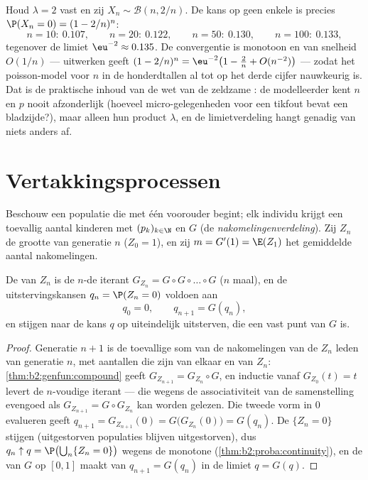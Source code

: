 \begin{example}\label{ex:b2:genfun:poissonnumerics}
Houd $\lambda = 2$ vast en zij $X_n \sim \mathcal B(n, 2/n)$. De
kans op geen enkele  is precies $\P(X_n = 0) = (1 -
2/n)^n$:
\[
n = 10:\ 0.107, \qquad
n = 20:\ 0.122, \qquad
n = 50:\ 0.130, \qquad
n = 100:\ 0.133,
\]
tegenover de limiet $\eu^{-2} \approx 0.135$. De convergentie is
monotoon en van snelheid $O(1/n)$ --- uitwerken geeft $(1 - 2/n)^n
= \eu^{-2}\bigl(1 - \tfrac2n + O(n^{-2})\bigr)$ --- zodat het
poisson-model voor $n$ in de honderdtallen al tot op het derde
cijfer nauwkeurig is. Dat is de praktische inhoud van de wet van de
zeldzame : de modelleerder kent $n$ en $p$ nooit
afzonderlijk (hoeveel micro-gelegenheden voor een tikfout bevat een
bladzijde?), maar alleen hun product $\lambda$, en de limietverdeling
hangt genadig van niets anders af.
\end{example}

\section{Vertakkingsprocessen}

Beschouw een populatie die met één voorouder begint; elk individu
krijgt  een toevallig aantal kinderen met 
$(p_k)_{k \in \N}$ en  $G$ (de
\emph{nakomelingenverdeling}). Zij $Z_n$ de grootte van generatie
$n$ ($Z_0 = 1$), en zij $m = G'(1) = \E(Z_1)$ het gemiddelde aantal
nakomelingen.

\begin{proposition}\label{prop:b2:genfun:branching}
De  van $Z_n$ is de $n$-de iterant $G_{Z_n} = G
\circ G \circ \dots \circ G$ ($n$ maal), en de uitstervingskansen
$q_n = \P(Z_n = 0)$ voldoen aan
\[
q_0 = 0, \qquad q_{n+1} = G(q_n),
\]
en stijgen naar de kans $q$ op uiteindelijk uitsterven, die een
vast punt van $G$ is.
\end{proposition}

\begin{proof}
Generatie $n + 1$ is de toevallige som van de nakomelingen van de
$Z_n$ leden van generatie $n$, met aantallen die  zijn
van elkaar en van $Z_n$: \cref{thm:b2:genfun:compound} geeft
$G_{Z_{n+1}} = G_{Z_n} \circ G$, en inductie vanaf $G_{Z_0}(t) = t$
levert de $n$-voudige iterant --- die wegens de associativiteit van
de samenstelling evengoed als $G_{Z_{n+1}} = G \circ G_{Z_n}$ kan
worden gelezen. Die tweede vorm in $0$ evalueren geeft $q_{n+1} =
G_{Z_{n+1}}(0) = G\bigl(G_{Z_n}(0)\bigr) = G(q_n)$. De
 $\{Z_n = 0\}$ stijgen (uitgestorven populaties
blijven uitgestorven), dus $q_n \uparrow q = \P\bigl(\bigcup_n\{Z_n
= 0\}\bigr)$ wegens de monotone 
(\cref{thm:b2:proba:continuity}), en de  van $G$ op
$[0, 1]$ maakt van $q_{n+1} = G(q_n)$ in de limiet $q = G(q)$.
\end{proof}

